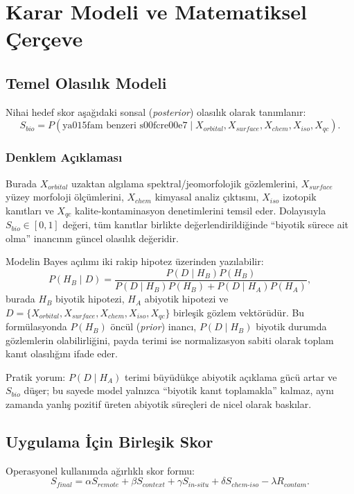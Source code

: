 \documentclass[12pt,a4paper]{article}
\begin{document}
\section{Karar Modeli ve Matematiksel Çerçeve}
\subsection{Temel Olasılık Modeli}
Nihai hedef skor aşağıdaki sonsal (\textit{posterior}) olasılık olarak tanımlanır:
\begin{equation}
S_{bio} = P(\text{ya\u015fam benzeri s\u00fcre\u00e7} \mid X_{orbital}, X_{surface}, X_{chem}, X_{iso}, X_{qc}).
\end{equation}

\subsubsection*{Denklem Açıklaması}
Burada $X_{orbital}$ uzaktan algılama spektral/jeomorfolojik gözlemlerini, $X_{surface}$ yüzey morfoloji ölçümlerini, $X_{chem}$ kimyasal analiz çıktısını, $X_{iso}$ izotopik kanıtları ve $X_{qc}$ kalite-kontaminasyon denetimlerini temsil eder. Dolayısıyla $S_{bio}\in[0,1]$ değeri, tüm kanıtlar birlikte değerlendirildiğinde ``biyotik sürece ait olma'' inancının güncel olasılık değeridir.

Modelin Bayes açılımı iki rakip hipotez üzerinden yazılabilir:
\begin{equation}
P(H_B\mid D)=\frac{P(D\mid H_B)P(H_B)}{P(D\mid H_B)P(H_B)+P(D\mid H_A)P(H_A)},
\end{equation}
burada $H_B$ biyotik hipotezi, $H_A$ abiyotik hipotezi ve $D=\{X_{orbital},X_{surface},X_{chem},X_{iso},X_{qc}\}$ birleşik gözlem vektörüdür. Bu formülasyonda $P(H_B)$ öncül (\textit{prior}) inancı, $P(D\mid H_B)$ biyotik durumda gözlemlerin olabilirliğini, payda terimi ise normalizasyon sabiti olarak toplam kanıt olasılığını ifade eder.

Pratik yorum: $P(D\mid H_A)$ terimi büyüdükçe abiyotik açıklama gücü artar ve $S_{bio}$ düşer; bu sayede model yalnızca ``biyotik kanıt toplamakla'' kalmaz, aynı zamanda yanlış pozitif üreten abiyotik süreçleri de nicel olarak baskılar.

\subsection{Uygulama İçin Birleşik Skor}
Operasyonel kullanımda ağırlıklı skor formu:
\begin{equation}
S_{final} = \alpha S_{remote} + \beta S_{context} + \gamma S_{in\text{-}situ} + \delta S_{chem\text{-}iso} - \lambda R_{contam}.
\end{equation}
\end{document}
